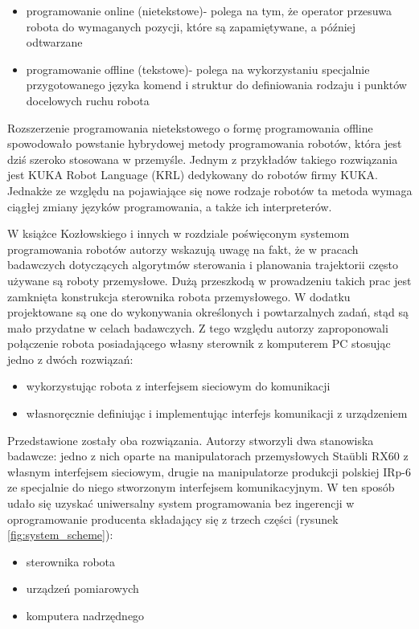 \documentclass[a4paper, 12pt, twoside]{article}
\begin{document}
\begin{itemize}
\item programowanie online (nietekstowe)- polega na tym, że operator przesuwa robota do wymaganych pozycji, które są zapamiętywane, a później odtwarzane
\item programowanie offline (tekstowe)- polega na wykorzystaniu specjalnie przygotowanego języka komend i struktur do definiowania rodzaju i punktów docelowych ruchu robota
\end{itemize}

Rozszerzenie programowania nietekstowego o formę programowania offline spowodowało powstanie hybrydowej metody programowania robotów, która jest dziś szeroko stosowana w przemyśle. Jednym z przykładów takiego rozwiązania jest KUKA Robot Language (KRL)  dedykowany do robotów firmy KUKA. Jednakże ze względu na pojawiające się nowe rodzaje robotów ta metoda wymaga ciągłej zmiany języków programowania, a także ich interpreterów.

W książce Kozłowskiego i innych \cite{systemkozlowski} w rozdziale poświęconym systemom programowania robotów autorzy wskazują uwagę na fakt, że w pracach badawczych dotyczących algorytmów sterowania i planowania trajektorii często używane są roboty przemysłowe. Dużą przeszkodą w prowadzeniu takich prac jest zamknięta konstrukcja sterownika robota przemysłowego. W dodatku projektowane są one do wykonywania określonych i powtarzalnych zadań, stąd są mało przydatne w celach badawczych. Z tego względu autorzy zaproponowali połączenie robota posiadającego własny sterownik z komputerem PC stosując jedno z dwóch rozwiązań:

\begin{itemize}
\item wykorzystując robota z interfejsem sieciowym do komunikacji
\item własnoręcznie definiując i implementując interfejs komunikacji z urządzeniem
\end{itemize} 

Przedstawione zostały oba rozwiązania. Autorzy stworzyli dwa stanowiska badawcze: jedno z nich oparte na manipulatorach przemysłowych Sta{\"u}bli RX60 z własnym interfejsem sieciowym, drugie na manipulatorze produkcji polskiej IRp-6 ze specjalnie do niego stworzonym interfejsem komunikacyjnym. W ten sposób udało się uzyskać uniwersalny system programowania bez ingerencji w oprogramowanie producenta składający się z trzech części (rysunek \ref{fig:system_scheme}):

\begin{itemize}
\item sterownika robota
\item urządzeń pomiarowych
\item komputera nadrzędnego
\end{itemize}
\end{document}
